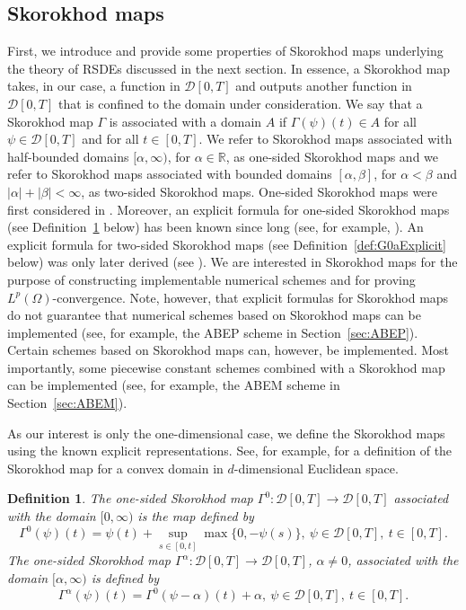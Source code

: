 \documentclass[11pt]{amsart}
\newtheorem{defi}[theorem]{Definition}
\begin{document}
{\subsection{Skorokhod maps}\label{sec:SkorMap}
First, we introduce and provide some properties of Skorokhod maps underlying the theory of RSDEs discussed in the next section. In essence, a Skorokhod map takes, in our case, a function in $\mathcal{D}[0,T]$ and outputs another function in $\mathcal{D}[0,T]$ that is confined to the domain under consideration. We say that a Skorokhod map $\Gamma$ is associated with a domain $A$ if $\Gamma (\psi)(t) \in A$ for all $\psi \in \mathcal{D}[0,T]$ and for all $t \in [0,T]$. We refer to Skorokhod maps associated with half-bounded domains $[\alpha,\infty)$, for $\alpha \in \mathbb{R}$, as one-sided Skorokhod maps and we refer to Skorokhod maps associated with bounded domains $[\alpha,\beta]$, for $\alpha < \beta$ and $|\alpha|+|\beta|<\infty$, as two-sided Skorokhod maps. One-sided Skorokhod maps were first considered in \cite{MR4521003}. Moreover, an explicit formula for one-sided Skorokhod maps (see Definition~\ref{def:Gexplicit} below) has been known since long (see, for example, \cite{SLOMINSKI1994197}). An explicit formula for two-sided Skorokhod maps (see Definition~\ref{def:G0aExplicit} below) was only later derived (see \cite{MR2349573}). We are interested in Skorokhod maps for the purpose of constructing implementable numerical schemes and for proving $L^{p}(\Omega)$-convergence. Note, however, that explicit formulas for Skorokhod maps do not guarantee that numerical schemes based on Skorokhod maps can be implemented (see, for example, the ABEP scheme in Section~\ref{sec:ABEP}). Certain schemes based on Skorokhod maps can, however, be implemented. Most importantly, some piecewise constant schemes combined with a Skorokhod map can be implemented (see, for example, the ABEM scheme in Section~\ref{sec:ABEM}).

As our interest is only the one-dimensional case, we define the Skorokhod maps using the known explicit representations. See, for example, \cite{MR529332} for a definition of the Skorokhod map for a convex domain in $d$-dimensional Euclidean space.

\begin{defi}\label{def:Gexplicit}
The one-sided Skorokhod map $\Gamma^{0} : \mathcal{D}[0,T] \to \mathcal{D}[0,T]$ associated with the domain $[0,\infty)$ is the map defined by
\begin{equation}\label{eq:G0explicit}
\Gamma^{0}(\psi)(t) = \psi(t) + \sup_{s  \in [0,t]} \max \{0, - \psi(s) \},\ \psi \in \mathcal{D}[0,T],\ t \in [0,T].
\end{equation}
The one-sided Skorokhod map $\Gamma^{\alpha} : \mathcal{D}[0,T] \to \mathcal{D}[0,T]$, $\alpha \neq 0$, associated with the domain $[\alpha,\infty)$ is defined by
\begin{equation}\label{eq:Gaexplicit}
\Gamma^{\alpha}(\psi)(t) = \Gamma^{0}(\psi - \alpha)(t) + \alpha,\ \psi \in \mathcal{D}[0,T],\ t \in [0,T].
\end{equation}
\end{defi}

}
\end{document}
